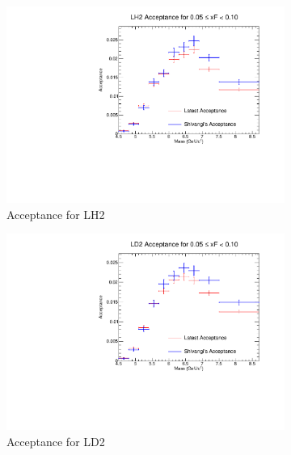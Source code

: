 \documentclass[11pt]{article}
\begin{document}
\begin{figure}[p]
    \centering
    \begin{subfigure}[b]{0.48\textwidth}
       \includegraphics[width=\linewidth]{./acceptancePlots/LH2_acceptance_xF_bin_1.pdf}
       \caption{Acceptance for LH2}
    \end{subfigure}\hfill
    \begin{subfigure}[b]{0.48\textwidth}
       \includegraphics[width=\linewidth]{./acceptancePlots/LD2_acceptance_xF_bin_1.pdf}
       \caption{Acceptance for LD2}
    \end{subfigure}
    \begin{subfigure}[b]{0.48\textwidth}

\end{subfigure}
\end{figure}
\end{document}
